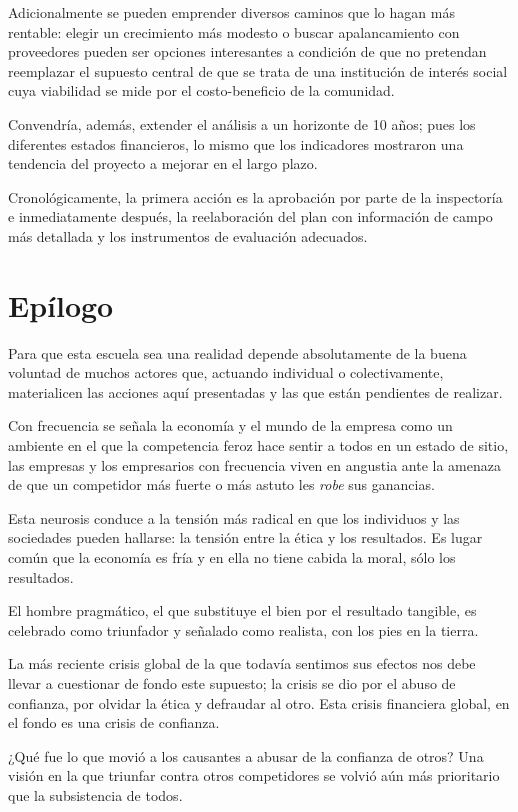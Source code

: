 Adicionalmente se pueden emprender diversos caminos que lo hagan más rentable: elegir un crecimiento más modesto o buscar apalancamiento con proveedores pueden ser opciones interesantes a condición de que no pretendan reemplazar el supuesto central de que se trata de una institución de interés social cuya viabilidad se mide por el costo-beneficio de la comunidad.

Convendría, además, extender el análisis a un horizonte de 10 años; pues los diferentes estados financieros, lo mismo que los indicadores mostraron una tendencia del proyecto a mejorar en el largo plazo.

Cronológicamente, la primera acción es la aprobación por parte de la inspectoría e inmediatamente después, la reelaboración del plan con información de campo más detallada y los instrumentos de evaluación adecuados.

\section*{Epílogo}

Para que esta escuela sea una realidad depende absolutamente de la buena voluntad de muchos actores que, actuando individual o colectivamente, materialicen las acciones aquí presentadas y las que están pendientes de realizar.

Con frecuencia se señala la economía y el mundo de la empresa como un ambiente en el que la competencia feroz hace sentir a todos en un estado de sitio, las empresas y los empresarios con frecuencia viven en angustia ante la amenaza de que un competidor más fuerte o más astuto les \emph{robe} sus ganancias.

Esta neurosis conduce a la tensión más radical en que los individuos y las sociedades pueden hallarse: la tensión entre la ética y los resultados. Es lugar común que la economía es fría y en ella no tiene cabida la moral, sólo los resultados.

El hombre pragmático, el que substituye el bien por el resultado tangible, es celebrado como triunfador y señalado como realista, con los pies en la tierra.

La más reciente crisis global de la que todavía sentimos sus efectos nos debe llevar a cuestionar de fondo este supuesto; la crisis se dio por el abuso de confianza, por olvidar la ética y defraudar al otro. Esta crisis financiera global, en el fondo es una crisis de confianza.

¿Qué fue lo que movió a los causantes a abusar de la confianza de otros? Una visión en la que triunfar contra otros competidores se volvió aún más prioritario que la subsistencia de todos.

